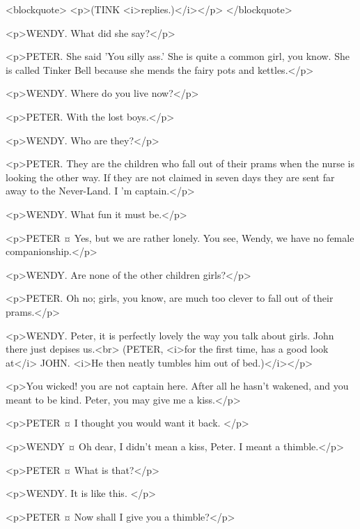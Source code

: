 <blockquote> <p>(TINK <i>replies.)</i></p> </blockquote>

<p>WENDY. What did she say?</p>

<p>PETER. She said 'You silly ass.' She is quite a common girl, you know. She is called Tinker Bell because she mends the fairy pots and kettles.</p>


<p>WENDY. Where do you live now?</p>

<p>PETER. With the lost boys.</p>

<p>WENDY. Who are they?</p>

<p>PETER. They are the children who fall out of their prams when the nurse is looking the other way. If they are not claimed in seven days they are sent far away to the Never-Land. I 'm captain.</p>

<p>WENDY. What fun it must be.</p>

<p>PETER ¤
Yes, but we are rather lonely. You see, Wendy, we have no female companionship.</p>

<p>WENDY. Are none of the other children girls?</p>

<p>PETER. Oh no; girls, you know, are much too clever to fall out of their prams.</p>

<p>WENDY. Peter, it is perfectly lovely the way you talk about girls. John there just depises us.<br> (PETER, <i>for the first time, has a good look at</i> JOHN. <i>He then neatly tumbles him out of bed.)</i></p>

<p>You wicked! you are not captain here.
After all he hasn't wakened, and you meant to be kind.
Peter, you may give me a kiss.</p>

<p>PETER ¤
I thought you would want it back.
</p>

<p>WENDY ¤
Oh dear, I didn't mean a kiss, Peter. I meant a thimble.</p>

<p>PETER ¤
What is that?</p>

<p>WENDY. It is like this.
</p>

<p>PETER ¤
Now shall I give you a thimble?</p>

